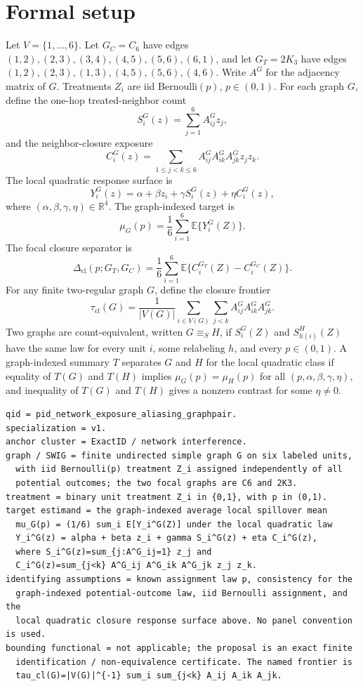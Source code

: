 \documentclass[11pt]{article}
\newcommand{\E}{\mathbb{E}}
\theoremstyle{definition}
\theoremstyle{plain}
\theoremstyle{remark}
\begin{document}
\section{Formal setup}
Let \(V=\{1,\ldots,6\}\). Let \(G_C=C_6\) have edges \((1,2),(2,3),(3,4),(4,5),(5,6),(6,1)\), and let \(G_T=2K_3\) have edges \((1,2),(2,3),(1,3),(4,5),(5,6),(4,6)\). Write \(A^G\) for the adjacency matrix of \(G\). Treatments \(Z_i\) are iid Bernoulli\((p)\), \(p\in(0,1)\). For each graph \(G\), define the one-hop treated-neighbor count
\[
S_i^G(z)=\sum_{j=1}^6 A^G_{ij}z_j,
\]
and the neighbor-closure exposure
\[
C_i^G(z)=\sum_{1\le j<k\le 6} A^G_{ij}A^G_{ik}A^G_{jk}z_jz_k.
\]
The local quadratic response surface is
\[
Y_i^G(z)=\alpha+\beta z_i+\gamma S_i^G(z)+\eta C_i^G(z),
\]
where \((\alpha,\beta,\gamma,\eta)\in\mathbb{R}^4\). The graph-indexed target is
\[
\mu_G(p)=\frac{1}{6}\sum_{i=1}^6 \E\{Y_i^G(Z)\}.
\]
The focal closure separator is
\[
\Delta_{\mathrm{cl}}(p;G_T,G_C)=\frac{1}{6}\sum_{i=1}^6 \E\{C_i^{G_T}(Z)-C_i^{G_C}(Z)\}.
\]
For any finite two-regular graph \(G\), define the closure frontier
\[
\tau_{\mathrm{cl}}(G)=\frac{1}{|V(G)|}\sum_{i\in V(G)}\sum_{j<k} A^G_{ij}A^G_{ik}A^G_{jk}.
\]
Two graphs are count-equivalent, written \(G\equiv_S H\), if \(S_i^G(Z)\) and \(S_{h(i)}^H(Z)\) have the same law for every unit \(i\), some relabeling \(h\), and every \(p\in(0,1)\). A graph-indexed summary \(T\) separates \(G\) and \(H\) for the local quadratic class if equality of \(T(G)\) and \(T(H)\) implies \(\mu_G(p)=\mu_H(p)\) for all \((p,\alpha,\beta,\gamma,\eta)\), and inequality of \(T(G)\) and \(T(H)\) gives a nonzero contrast for some \(\eta\ne0\).

\begin{verbatim}
qid = pid_network_exposure_aliasing_graphpair.
specialization = v1.
anchor cluster = ExactID / network interference.
graph / SWIG = finite undirected simple graph G on six labeled units,
  with iid Bernoulli(p) treatment Z_i assigned independently of all
  potential outcomes; the two focal graphs are C6 and 2K3.
treatment = binary unit treatment Z_i in {0,1}, with p in (0,1).
target estimand = the graph-indexed average local spillover mean
  mu_G(p) = (1/6) sum_i E[Y_i^G(Z)] under the local quadratic law
  Y_i^G(z) = alpha + beta z_i + gamma S_i^G(z) + eta C_i^G(z),
  where S_i^G(z)=sum_{j:A^G_ij=1} z_j and
  C_i^G(z)=sum_{j<k} A^G_ij A^G_ik A^G_jk z_j z_k.
identifying assumptions = known assignment law p, consistency for the
  graph-indexed potential-outcome law, iid Bernoulli assignment, and the
  local quadratic closure response surface above. No panel convention is used.
bounding functional = not applicable; the proposal is an exact finite
  identification / non-equivalence certificate. The named frontier is
  tau_cl(G)=|V(G)|^{-1} sum_i sum_{j<k} A_ij A_ik A_jk.
\end{verbatim}
\end{document}

